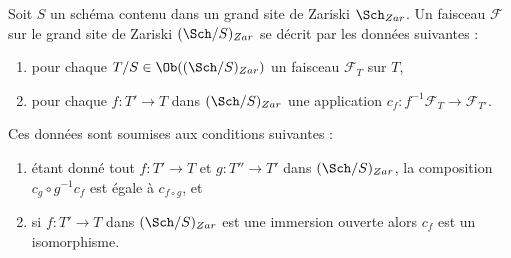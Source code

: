 \begin{lemma}
\label{lemma-characterize-sheaf-big}
Soit $S$ un schéma contenu dans un grand site de Zariski $\Sch_{Zar}$. Un faisceau $\mathcal{F}$ sur le grand site de Zariski $(\Sch/S)_{Zar}$ se décrit par les données suivantes :
\begin{enumerate}
\item pour chaque $T/S \in \Ob((\Sch/S)_{Zar})$ un faisceau $\mathcal{F}_T$ sur $T$,
\item pour chaque $f : T' \to T$ dans $(\Sch/S)_{Zar}$ une application $c_f : f^{-1}\mathcal{F}_T \to \mathcal{F}_{T'}$.
\end{enumerate}
Ces données sont soumises aux conditions suivantes :
\begin{enumerate}
\item[(a)] étant donné tout $f : T' \to T$ et $g : T'' \to T'$ dans $(\Sch/S)_{Zar}$, la composition $c_g \circ g^{-1}c_f$ est égale à $c_{f \circ g}$, et
\item[(b)] si $f : T' \to T$ dans $(\Sch/S)_{Zar}$ est une immersion ouverte alors $c_f$ est un isomorphisme.
\end{enumerate}
\end{lemma}

